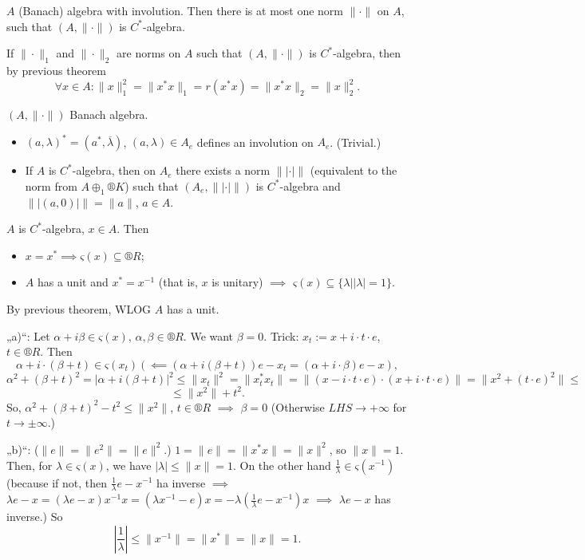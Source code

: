 \documentclass[12pt]{article}					%
\begin{document}
\begin{dusledek}
	$A$ (Banach) algebra with involution. Then there is at most one norm $\|·\|$ on $A$, such that $(A, \|·\|)$ is $C^*$-algebra.

	\begin{dukazin}
		If $\|·\|_1$ and $\|·\|_2$ are norms on $A$ such that $(A, \|·\|)$ is $C^*$-algebra, then by previous theorem
		$$ \forall x \in A: \|x\|_1^2 = \|x^* x\|_1 = r(x^* x) = \|x^* x\|_2 = \|x\|_2^2. $$
	\end{dukazin}
\end{dusledek}

\begin{veta}
	$(A, \|·\|)$ Banach algebra.

	\begin{itemize}
		\item $(a, \lambda)^* = (a^*, \overline{\lambda})$, $(a, \lambda) \in A_e$ defines an involution on $A_e$. (Trivial.)
		\item If $A$ is $C^*$-algebra, then on $A_e$ there exists a norm $\| |·| \|$ (equivalent to the norm from $A \oplus_1 ®K$) such that $(A_e, \| |·| \|)$ is $C^*$-algebra and $\| |(a, 0)| \| = \|a\|$, $a \in A$.
	\end{itemize}
\end{veta}

\begin{veta}
	$A$ is $C^*$-algebra, $x \in A$. Then
	
	\begin{itemize}
		\item $x = x^* \implies ς(x) \subseteq ®R$;
		\item $A$ has a unit and $x^* = x^{-1}$ (that is, $x$ is unitary) $\implies$ $ς(x) \subseteq \{λ | |λ| = 1\}$.
	\end{itemize}

	\begin{dukazin}
		By previous theorem, WLOG $A$ has a unit.

		„a)“: Let $\alpha + i\beta \in ς(x)$, $\alpha, \beta \in ®R$. We want $\beta = 0$. Trick: $x_t := x + i·t·e$, $t \in ®R$. Then
		$$ \alpha + i·(\beta + t) \in ς(x_t) (\impliedby (\alpha + i(\beta + t))e - x_t = (\alpha + i·\beta)e - x), $$
		$$ \alpha^2 + (\beta + t)^2 = |\alpha + i(\beta + t)|^2 ≤ \|x_t\|^2 = \|x_t^* x_t\| = \|(x - i·t·e)·(x + i·t·e)\| = \|x^2 + (t·e)^2\| ≤ $$
		$$ ≤ \|x^2\| + t^2. $$
		So, $\alpha^2 + (\beta + t)^2 - t^2 ≤ \|x^2\|$, $t \in ®R$ $\implies$ $\beta = 0$ (Otherwise $LHS \rightarrow +∞$ for $t \rightarrow ±∞$.)

		„b)“: ($\|e\| = \|e^2\| = \|e\|^2$.) $1 = \|e\| = \|x^*x\| = \|x\|^2$, so $\|x\| = 1$. Then, for $λ \in ς(x)$, we have $|λ| ≤ \|x\| = 1$. On the other hand $\frac{1}{λ} \in ς(x^{-1})$ (because if not, then $\frac{1}{λ}e - x^{-1}$ ha inverse $\implies$ $λ e - x = (λ e - x)x^{-1}x = (λ x^{-1} - e)x = -λ (\frac{1}{λ}e - x^{-1})x$ $\implies$ $λ e - x$ has inverse.) So
		$$ \left|\frac{1}{λ}\right| ≤ \|x^{-1}\| = \|x^*\| = \|x\| = 1. $$
	\end{dukazin}
\end{veta}
\end{document}
